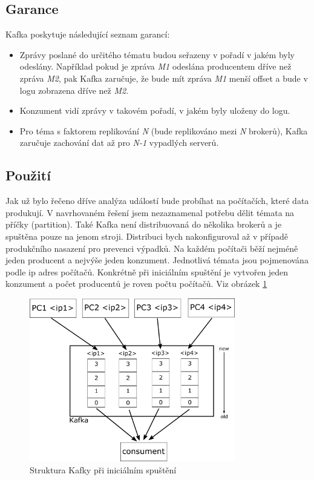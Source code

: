 \documentclass[
  digital, %
  table,   %
  nolof,     %
  nolot,     %
  twoside,
  nocover,
  monochrome,
  12pt
]{fithesis3}
\begin{document}
\subsection*{Garance}
Kafka poskytuje následující seznam garancí:
\begin{itemize}
  \item Zprávy poslané do určitého tématu budou seřazeny v pořadí v jakém byly odeslány. Například pokud je zpráva \textit{M1} odeslána producentem dříve než zpráva \textit{M2}, pak Kafka zaručuje, že bude mít zpráva \textit{M1} menší offset a bude v logu zobrazena dříve než \textit{M2}.
  \item Konzument vidí zprávy v takovém pořadí, v jakém byly uloženy do logu.
  \item Pro téma s faktorem replikování \textit{N} (bude replikováno mezi \textit{N} brokerů), Kafka zaručuje zachování dat až pro \textit{N-1} vypadlých serverů.
\end{itemize}

\subsection*{Použití}
Jak už bylo řečeno dříve analýza událostí bude probíhat na počítačích, které data produkují. V navrhovaném řešení jsem nezaznamenal potřebu dělit témata na příčky (partition). Také Kafka není distribuovaná do několika brokerů a je spuštěna pouze na jenom stroji. Distribuci bych nakonfiguroval až v případě produkčního nasazení pro prevenci výpadků. Na každém počítači běží nejméně jeden producent a nejvýše jeden konzument. Jednotlivá témata jsou pojmenována podle ip adres počítačů. Konkrétně při iniciálním spuštění je vytvořen jeden konzument a počet producentů je roven počtu počítačů. Viz obrázek \ref{fig:kafka-impl}

\begin{figure}[h]
	\centering
    \includegraphics[width=0.8\textwidth, height=0.45\textheight]{images/kafka-impl.png}
    \caption{Struktura Kafky při iniciálním spuštění}
    \label{fig:kafka-impl}
\end{figure}
\end{document}
